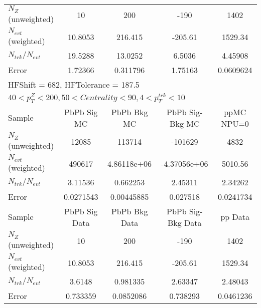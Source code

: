 \begin{table}[h!]
\begin{tabular}{|l|c|c|c|c|}
$N_Z$ (unweighted)& 10             & 200            & -190           & 1402           \\
$N_{evt}$ (weighted)& 10.8053        & 216.415        & -205.61        & 1529.34        \\
$N_{trk}/N_{evt}$& 19.5288        & 13.0252        & 6.5036         & 4.45908        \\
Error          & 1.72366        & 0.311796       & 1.75163        & 0.0609624      \\
\hline\hline
\multicolumn{5}{l}{ HFShift = 682, HFTolerance = 187.5}\\
\multicolumn{5}{l}{ $40 < p_{T}^{Z} < 200, 50 < Centrality < 90, 4 < p_{T}^{trk} < 10$}\\
\hline\hline
Sample         & PbPb Sig MC    & PbPb Bkg MC    & PbPb Sig-Bkg MC& ppMC NPU=0     \\
$N_Z$ (unweighted)& 12085          & 113714         & -101629        & 4832           \\
$N_{evt}$ (weighted)& 490617         & 4.86118e+06    & -4.37056e+06   & 5010.56        \\
$N_{trk}/N_{evt}$& 3.11536        & 0.662253       & 2.45311        & 2.34262        \\
Error          & 0.0271543      & 0.00445885     & 0.027518       & 0.0241734      \\
\hline
Sample         & PbPb Sig Data  & PbPb Bkg Data  & PbPb Sig-Bkg Data& pp Data  \\
$N_Z$ (unweighted)& 10             & 200            & -190           & 1402           \\
$N_{evt}$ (weighted)& 10.8053        & 216.415        & -205.61        & 1529.34        \\
$N_{trk}/N_{evt}$& 3.6148         & 0.981335       & 2.63347        & 2.48043        \\
Error          & 0.733359       & 0.0852086      & 0.738293       & 0.0461236      \\
\hline\hline
\end{tabular}
\end{table}
\clearpage

